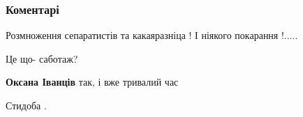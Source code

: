 
 
 
 
 
\subsubsection{Коментарі}
\label{sec:05_08_2021.fb.popovich_jaroslav.1.mova_shkola_ivano_frankovsk.cmt}

\begin{itemize}
 
Розмноження сепаратистів та какаяразніца !
І ніякого покарання !.....

 
Це що- саботаж?

\begin{itemize}
 
\textbf{Оксана Іванців} так, і вже тривалий час
\end{itemize}

 
Стидоба .

 

\end{itemize}
